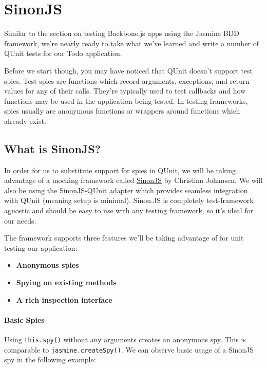 \documentclass[9pt]{book}
\begin{document}
\section{SinonJS}\label{sinonjs}

Similar to the section on testing Backbone.js apps using the Jasmine BDD
framework, we're nearly ready to take what we've learned and write a
number of QUnit tests for our Todo application.

Before we start though, you may have noticed that QUnit doesn't support
test spies. Test spies are functions which record arguments, exceptions,
and return values for any of their calls. They're typically used to test
callbacks and how functions may be used in the application being tested.
In testing frameworks, spies usually are anonymous functions or wrappers
around functions which already exist.

\subsection{What is SinonJS?}\label{what-is-sinonjs}

In order for us to substitute support for spies in QUnit, we will be
taking advantage of a mocking framework called
\href{http://sinonjs.org/}{SinonJS} by Christian Johansen. We will also
be using the \href{http://sinonjs.org/qunit/}{SinonJS-QUnit adapter}
which provides seamless integration with QUnit (meaning setup is
minimal). Sinon.JS is completely test-framework agnostic and should be
easy to use with any testing framework, so it's ideal for our needs.

The framework supports three features we'll be taking advantage of for
unit testing our application:

\begin{itemize}
\itemsep1pt\parskip0pt
\item
  \textbf{Anonymous spies}
\item
  \textbf{Spying on existing methods}
\item
  \textbf{A rich inspection interface}
\end{itemize}

\paragraph{Basic Spies}\label{basic-spies}

Using \texttt{this.spy()} without any arguments creates an anonymous
spy. This is comparable to \texttt{jasmine.createSpy()}. We can observe
basic usage of a SinonJS spy in the following example:
\end{document}
